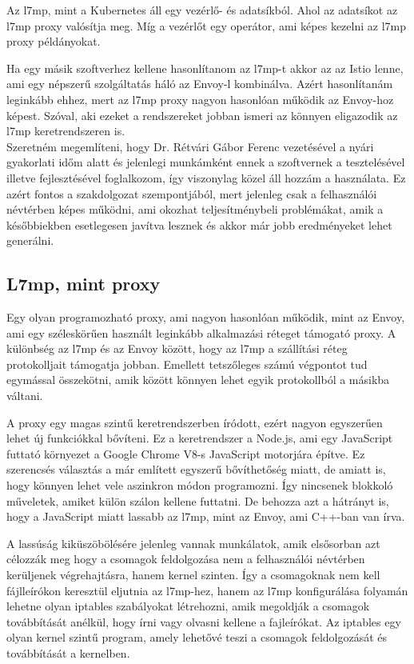Az l7mp, mint a Kubernetes áll egy vezérlő- és adatsíkból. Ahol az adatsíkot 
az l7mp proxy valósítja meg. Míg a vezérlőt egy operátor, ami képes kezelni 
az l7mp proxy példányokat. 

Ha egy másik szoftverhez kellene hasonlítanom az l7mp-t akkor az az Istio 
lenne, ami egy népszerű szolgáltatás háló az Envoy-l kombinálva. Azért 
hasonlítanám leginkább ehhez, mert az l7mp proxy nagyon hasonlóan működik az
Envoy-hoz képest. Szóval, aki ezeket a rendszereket jobban ismeri az 
könnyen eligazodik az l7mp keretrendszeren is.\\

Szeretném megemlíteni, hogy Dr. Rétvári Gábor Ferenc vezetésével a nyári
gyakorlati időm alatt és jelenlegi munkámként ennek a szoftvernek a tesztelésével 
illetve fejlesztésével foglalkozom, így viszonylag közel áll hozzám a használata.
Ez azért fontos a szakdolgozat szempontjából, mert jelenleg csak a felhasználói névtérben
képes működni, ami okozhat teljesítménybeli problémákat, amik a későbbiekben 
esetlegesen javítva lesznek és akkor már jobb eredményeket lehet generálni. 

\subsection{L7mp, mint proxy}

Egy olyan programozható proxy, ami nagyon hasonlóan működik, mint az Envoy, ami 
egy széleskörűen használt leginkább alkalmazási réteget támogató proxy. A különbség
az l7mp és az Envoy között, hogy az l7mp a szállítási réteg protokolljait 
támogatja jobban. Emellett tetszőleges számú végpontot tud egymással összekötni, 
amik között könnyen lehet egyik protokollból a másikba váltani. 

A proxy egy magas szintű keretrendszerben íródott, ezért nagyon egyszerűen 
lehet új funkciókkal bővíteni. Ez a keretrendszer a Node.js, ami egy JavaScript
futtató környezet a Google Chrome V8-s JavaScript motorjára építve. Ez szerencsés 
választás a már említett egyszerű bővíthetőség miatt, de  amiatt is, hogy
könnyen lehet vele aszinkron módon programozni. Így nincsenek blokkoló műveletek,
amiket külön szálon kellene futtatni. De behozza azt a hátrányt is, hogy a 
JavaScript miatt lassabb az l7mp, mint az Envoy, ami C++-ban van írva. 

A lassúság kiküszöbölésére jelenleg vannak munkálatok, amik elsősorban azt 
célozzák meg hogy a csomagok feldolgozása nem a felhasználói névtérben kerüljenek
végrehajtásra, hanem kernel szinten. Így a csomagoknak nem kell fájlleírókon 
keresztül eljutnia az l7mp-hez, hanem az l7mp konfigurálása folyamán lehetne
olyan iptables szabályokat létrehozni, amik megoldják a csomagok továbbítását
anélkül, hogy írni vagy olvasni kellene a fajleírókat. Az iptables egy olyan 
kernel szintű program, amely lehetővé teszi a csomagok feldolgozását és továbbítását
a kernelben. \\

